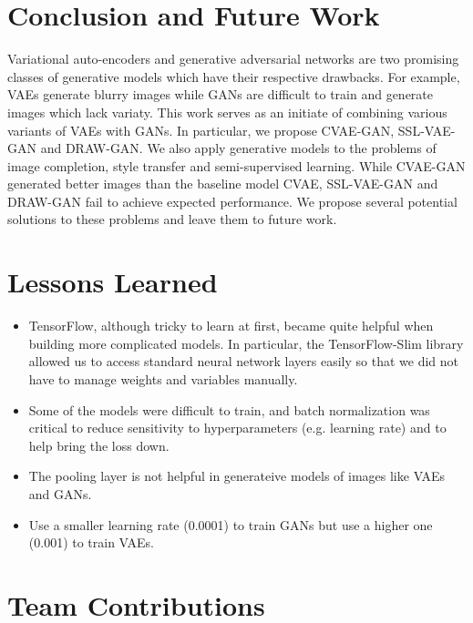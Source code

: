 \documentclass[10pt]{article}
\begin{document}
\section{Conclusion and Future Work}
Variational auto-encoders and generative adversarial networks are two promising classes of generative models which have their respective drawbacks. For example, VAEs generate blurry images while GANs are difficult to train and generate images which lack variaty. This work serves as an initiate of combining various variants of VAEs with GANs. In particular, we propose CVAE-GAN, SSL-VAE-GAN and DRAW-GAN. We also apply generative models to the problems of image completion, style transfer and semi-supervised learning. While CVAE-GAN generated better images than the baseline model CVAE, SSL-VAE-GAN and DRAW-GAN fail to achieve expected performance. We propose several potential solutions to these problems and leave them to future work.
\section{Lessons Learned}
\begin{itemize}
\item TensorFlow, although tricky to learn at first, became quite helpful when building more complicated models. In particular, the TensorFlow-Slim library allowed us to access standard neural network layers easily so that we did not have to manage weights and variables manually.

\item Some of the models were difficult to train, and batch normalization was critical to reduce sensitivity to hyperparameters (e.g. learning rate) and to help bring the loss down.
\item The pooling layer is not helpful in generateive models of images like VAEs and GANs.
\item Use a smaller learning rate (0.0001) to train GANs but use a higher one (0.001) to train VAEs.
\end{itemize}
\section{Team Contributions}
\end{document}
